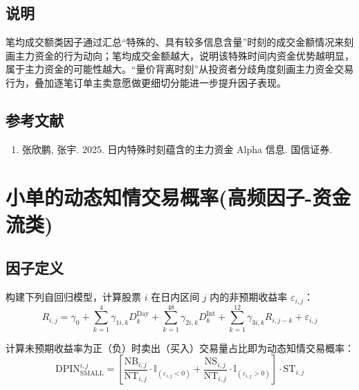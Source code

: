 \documentclass{article}
\begin{document}
\subsection{说明}
笔均成交额类因子通过汇总“特殊的、具有较多信息含量”时刻的成交金额情况来刻画主力资金的行为动向；笔均成交金额越大，说明该特殊时间内资金优势越明显，属于主力资金的可能性越大。“量价背离时刻”从投资者分歧角度刻画主力资金交易行为，叠加逐笔订单主卖意愿做更细切分能进一步提升因子表现。

\subsection{参考文献}
\begin{enumerate}
    \item 张欣鹏, 张宇. 2025. 日内特殊时刻蕴含的主力资金 Alpha 信息. 国信证券.
\end{enumerate}

\section{小单的动态知情交易概率(高频因子-资金流类)}

\subsection{因子定义}

构建下列自回归模型，计算股票 \( i \) 在日内区间 \( j \) 内的非预期收益率 \( \varepsilon_{i,j} \)：
\begin{equation}
    R_{i,j} = \gamma_0 + \sum_{k=1}^{4} \gamma_{1i,k} D_k^{\mathrm{Day}} + \sum_{k=1}^{48} \gamma_{2i,k} D_k^{\mathrm{Int}} + \sum_{k=1}^{12} \gamma_{3i,k} R_{i,j-k} + \varepsilon_{i,j}
\end{equation}

计算未预期收益率为正（负）时卖出（买入）交易量占比即为动态知情交易概率：
\begin{equation}
    \mathrm{DPIN}_{\mathrm{SMALL}}^{i,j} = \left[ \frac{\mathrm{NB}_{i,j}}{\mathrm{NT}_{i,j}} \cdot \mathbb{I}_{(\varepsilon_{i,j} < 0)} + \frac{\mathrm{NS}_{i,j}}{\mathrm{NT}_{i,j}} \cdot \mathbb{I}_{(\varepsilon_{i,j} > 0)} \right] \cdot \mathrm{ST}_{i,j}
\end{equation}
\end{document}
